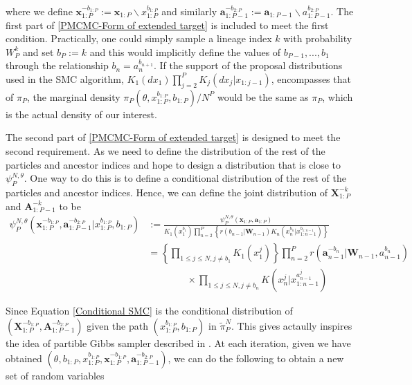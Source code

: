 \documentclass[12pt,a4paper]{article}
\begin{document}
where we define $\mathbf{x}_{1:P}^{-b_{1:P}} := \mathbf{x}_{1:P}\backslash x_{1:P}^{b_{1:P}}$ and similarly $\mathbf{a}_{1:P-1}^{-b_{2:P}} := \mathbf{a}_{1:P-1} \backslash a_{1:P-1}^{b_{2:P}}$. The first part of \eqref{PMCMC-Form of extended target} is included to meet the first condition. Practically, one could simply sample a lineage index $k$ with probability $W_P^k$ and set $b_P:=k$ and this would implicitly define the values of $b_{P-1},...,b_1$ through the relationship $b_n = a_n^{b_{n+1}}$. If the support of the proposal distributions used in the SMC algorithm, $K_1(dx_1)\prod_{j=2}^{P}K_j(dx_j|x_{1:j-1})$, encompasses that of $\pi_P$, the marginal density $\pi_P(\theta,x_{1:P}^{b_{1:P}},b_{1:P})/N^P$ would be the same as $\pi_P$, which is the actual density of our interest. 

The second part of \eqref{PMCMC-Form of extended target} is designed to meet the second requirement. As we need to define the distribution of the rest of the particles and ancestor indices and hope to design a distribution that is close to $\psi_P^{N,\theta}$. One way to do this is to define a conditional distribution of the rest of the particles and ancestor indices. Hence, we can define the joint distribution of $\textbf{X}_{1:P}^{-k}$ and $\textbf{A}_{1:P-1}^{-k}$ to be
\begin{equation}
    \label{Conditional SMC} 
    \begin{split}
        \psi_P^{N,\theta}\left(\mathbf{x}_{1:P}^{-b_{1:P}},\mathbf{a}_{1:P-1}^{-b_{2:P}}|x_{1:P}^{b_{1:P}},b_{1:P}\right) &:= \frac{\psi_P^{N,\theta}(\mathbf{x}_{1:P},\mathbf{a}_{1:P})}{K_1\left(x_1^{b_1}\right)\prod_{n=2}^P \left\{r\left(b_{n-1}|\mathbf{W}_{n-1}\right)K_n\left(x_n^{b_n}|x_{1:n-1}^{b_{1:n-1}}\right)\right\}}\\
        &= \left\{\prod_{1\leq j \leq N,j \neq b_1} K_1\left(x_1^j\right)\right\}\prod_{n=2}^P r\left(\mathbf{a}_{n-1}^{-b_{n}}|\mathbf{W}_{n-1},a_{n-1}^{b_n}\right) \\
        &\quad\quad\quad\quad \times \prod_{1 \leq j \leq N, j \neq b_n} K\left(x_n^j|x_{1:n-1}^{a_{n-1}^j}\right)
    \end{split}
\end{equation} 


Since Equation \eqref{Conditional SMC} is the conditional distribution of \(\left(\textbf{X}_{1:P}^{-b_{1:P}},\textbf{A}_{1:P-1}^{-b_{2:P}}\right)\) given the path \(\left(x_{1:P}^{b_{1:P}},b_{1:P}\right)\) in \(\tilde{\pi}_P^N\). This gives actaully inspires the idea of partible Gibbs sampler described in \cite{andrieu2010particle}. At each iteration, given we have obtained \(\left(\theta,b_{1:P},x_{1:P}^{b_{1:P}},\textbf{x}_{1:P}^{-b_{1:P}},\textbf{a}_{1:P-1}^{-b_{2:P}}\right)\), we can do the following to obtain a new set of random variables
\end{document}

